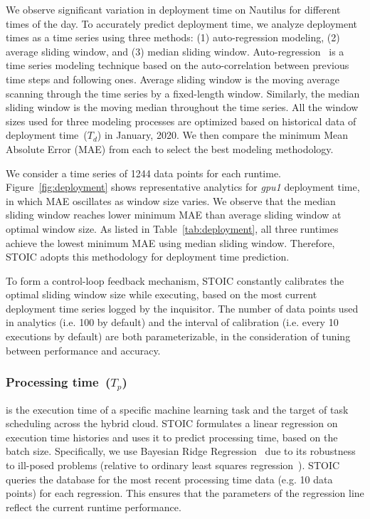 We observe significant variation in deployment time on Nautilus for different times of the day. To accurately predict deployment time, we analyze deployment times as a time series using three methods: (1) auto-regression modeling, (2) average sliding window, and (3) median sliding window. Auto-regression~\cite{ref:autoreg} is a time series modeling technique based on the auto-correlation between previous time steps and following ones. Average sliding window is the moving average~\cite{ref:moveavg} scanning through the time series by a fixed-length window. Similarly, the median sliding window is the moving median throughout the time series. All the window sizes used for three modeling processes are optimized based on historical data of deployment time~($T_d$) in January, 2020. We then compare the minimum Mean Absolute Error (MAE) from each to select the best modeling methodology. 

We consider a time series of 1244 data points for each runtime. Figure~\ref{fig:deployment} shows representative analytics for \textit{gpu1} deployment time, in which MAE oscillates as window size varies. We observe that the median sliding window reaches lower minimum MAE than average sliding window at optimal window size. As listed in Table~\ref{tab:deployment}, all three runtimes achieve the lowest minimum MAE using median sliding window. Therefore, STOIC adopts this methodology for deployment time prediction. 

To form a control-loop feedback mechanism, STOIC constantly calibrates the optimal sliding window size while executing, based on the most current deployment time series logged by the inquisitor. The number of data points used in analytics (i.e. 100 by default) and the interval of calibration (i.e. every 10 executions by default) are both parameterizable, in the consideration of tuning between performance and accuracy. 
 
\subsubsection{Processing time~($T_p$)} is the execution time of a specific machine learning task and the target of task scheduling across the hybrid cloud. STOIC formulates a linear regression on execution time histories and uses it to predict processing time, based on the batch size. Specifically, we use Bayesian Ridge Regression~\cite{ref:brr} due to its robustness to ill-posed problems (relative to ordinary least squares regression~\cite{ref:ols}). STOIC queries the database for the most recent processing time data (e.g. 10 data points) for each regression. This ensures that the parameters of the regression line reflect the current runtime performance.
 
